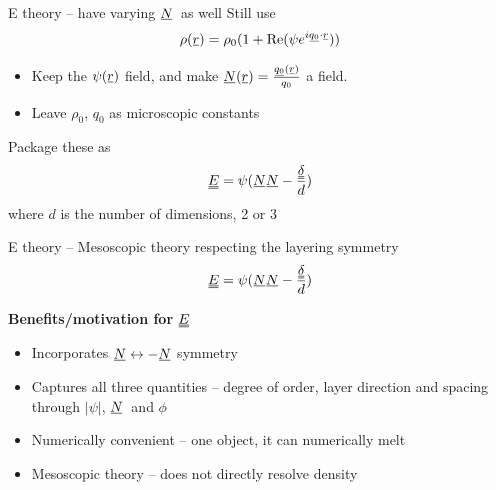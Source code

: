 \documentclass[10pt,mathserif]{beamer}
\newcommand{\suf}[2]{\stackunder[0.5pt]{\stackunder[1pt]{\ensuremath{#1}}{\rule{\widthof{\ensuremath{#2}}*\real{0.9}}{.1ex}}}{}}
\newcommand{\duf}[2]{\stackunder[0.5pt]{\stackunder[0.8pt]{\stackunder[1pt]{\ensuremath{#1}}{\rule{\widthof{\ensuremath{#2}}*\real{0.9}}{.1ex}}}{\rule{\widthof{\ensuremath{#2}}*\real{0.9}}{.1ex}}}{}}
\newcommand{\su}[1]{\suf{#1}{#1}}
\newcommand{\du}[1]{\duf{#1}{#1}}
\newcommand{\ssu}[1]{\scriptsize\su{#1}\normalsize}
\newcommand{\NN}{\ensuremath{\su{N}}}
\newcommand{\EE}{\ensuremath{\du{E}}}
\newcommand{\extra}[1]{\color{gray} #1 \normalcolor}
\newcommand{\subheading}[1]{\large\textbf{#1}\normalsize}
\begin{document}
\begin{frame}[fragile]{E theory -- have varying \NN\ as well}
    \newrefsection
    Still use
    \begin{equation*}
        \rho(\su{r}) = \rho_0 (1 + \Re(\psi e^{i\ssu{q_0} \cdot \ssu{r}}))
    \end{equation*}
    \vspace{-1.5em}
    \begin{itemize}
        \item Keep the $\psi(\su{r})$ field, and make $\NN(\su{r}) = \frac{\ssu{q_0}(\ssu{r})}{q_0}$ a field.
        \item Leave $\rho_0$, $q_0$ as microscopic constants
    \end{itemize}
    \vfill
    Package these as
    \begin{equation*}
        \du{E} = \psi(\su{N}\su{N} - \frac{\du{\delta}}{d})
    \end{equation*}
    \extra{where $d$ is the number of dimensions, 2 or 3}
\end{frame}

\begin{frame}[fragile]{E theory -- Mesoscopic theory respecting the layering symmetry}
    \newrefsection
    \vspace{-\fill}
    \begin{equation*}
        \du{E} = \psi(\su{N}\su{N} - \frac{\du{\delta}}{d})
    \end{equation*}
    \vfill

    \subheading{Benefits/motivation for \EE}
    \begin{itemize}
        \item Incorporates $\NN\leftrightarrow-\NN$ symmetry
        \item Captures all three quantities -- degree of order, layer direction and spacing through $|\psi|$, \NN\ and $\phi$
        \item Numerically convenient -- one object, it can numerically melt
        \extra{\item Mesoscopic theory -- does not directly resolve density}
    \end{itemize}
\end{frame}
\end{document}
